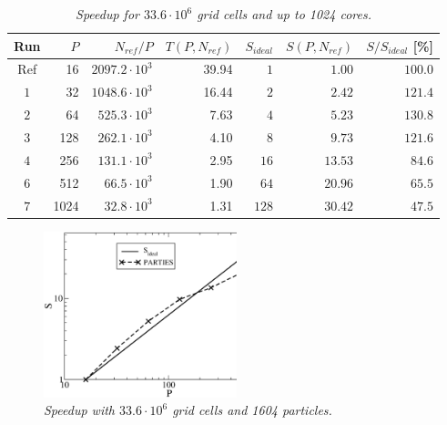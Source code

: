 \documentclass[10pt]{article}
\begin{document}
\begin{table}[t]
\centering
\begin{tabular}{c | r | r | r | r | r | r}
\hline
\hline
Run   & $P$       & $N_{ref} / P$        & $T(P,N_{ref})$      &  $S_{ideal}$ & $S(P,N_{ref})$    & $S / S_{ideal}$ [\%] \\
\hline
Ref   &   16      & $2097.2 \cdot 10^3$  & 39.94               &  $  1$       &  $1.00$           &  $100.0$     \\  %
$1$   &   32      & $1048.6 \cdot 10^3$  & 16.44               &  $  2$       &  $2.42$           &  $121.4$     \\  %
$2$   &   64      & $ 525.3 \cdot 10^3$  &  7.63               &  $  4$       &  $5.23$           &  $130.8$     \\  %
$3$   &  128      & $ 262.1 \cdot 10^3$  &  4.10               &  $  8$       &  $9.73$           &  $121.6$     \\  %
$4$   &  256      & $ 131.1 \cdot 10^3$  &  2.95               &  $ 16$       & $13.53$           &  $ 84.6$     \\  %
$6$   &  512      & $  66.5 \cdot 10^3$  &  1.90               &  $ 64$       & $20.96$           &  $ 65.5$     \\  %
$7$   & 1024      & $  32.8 \cdot 10^3$  &  1.31               &  $128$       & $30.42$           &  $ 47.5$     \\  %
\hline
\hline
\end{tabular}
 \caption{\small \textit{Speedup for $33.6 \cdot 10^6$ grid cells and up to 1024 cores.}}
\label{tab:speedup}
\end{table}
%
\begin{figure}[t]
\centering
\includegraphics[width=0.5\textwidth]{Figures/speedup.eps}
\caption{\small \textit{Speedup with $33.6 \cdot 10^6$ grid cells and 1604 particles.}}
\label{fig:speedup}
\end{figure}
\end{document}

